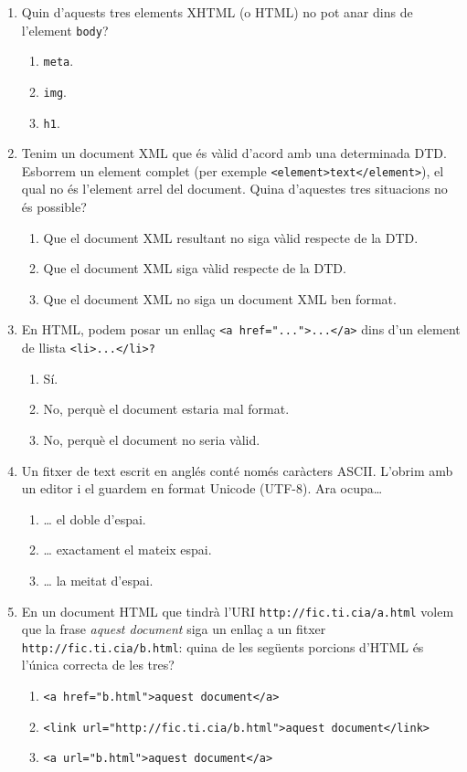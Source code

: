 \begin{enumerate}
\item Quin d'aquests tres elements XHTML (o HTML) no pot anar dins de l'element \texttt{body}? 

  \begin{enumerate}
  \item \texttt{meta}.
  \item \texttt{img}.
  \item \texttt{h1}.
  \end{enumerate}


\item Tenim un document XML que és vàlid d'acord amb una determinada DTD. Esborrem un element complet (per exemple \texttt{<element>text</element>}), el qual no és l'element arrel del document. Quina d'aquestes tres situacions no és possible? 
  \begin{enumerate}
  \item Que el document XML resultant no siga vàlid respecte de la DTD.
  \item Que el document XML siga vàlid respecte de la DTD.
  \item Que el document XML no siga un document XML ben format.
  \end{enumerate}

\item En HTML, podem posar un enllaç \texttt{<a href="..."}\texttt{>...</a>} dins d'un element de llista \texttt{<li>...</li>?}  
  \begin{enumerate}
  \item Sí.
  \item No, perquè el document estaria mal format.
  \item No, perquè el document no seria vàlid.
  \end{enumerate}

\item Un fitxer de text escrit en anglés conté només caràcters ASCII. L'obrim amb un editor i el guardem en format Unicode (UTF-8). Ara ocupa{\ldots} 
  \begin{enumerate}
  \item {\ldots} el doble d'espai.
  \item {\ldots} exactament el mateix espai.
  \item {\ldots} la meitat d'espai.
  \end{enumerate}

\item En un document HTML que tindrà l'URI \texttt{http://fic.ti.cia/a.html} volem que la frase \emph{aquest document} siga un enllaç a un fitxer \texttt{http://fic.ti.cia/b.html}: quina de les següents porcions d'HTML és l'única correcta de les tres?   
  \begin{enumerate}
  \item \texttt{<a href="b.html"}\texttt{>aquest document</a>} 
  \item \texttt{<link url="http://fic.ti.cia/b.html"}\texttt{>aquest document</link>}
  \item \texttt{<a url="b.html"}\texttt{>aquest document</a>}
  \end{enumerate}


\end{enumerate}
